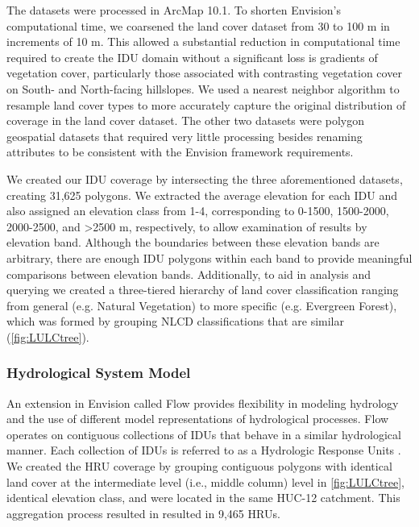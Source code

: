 \documentclass[11pt,letterpaper]{article}
\begin{document}
The datasets were processed in ArcMap 10.1. To shorten Envision's computational time, we coarsened the land cover dataset from 30 to 100 m in increments of 10 m. This allowed a substantial reduction in computational time required to create the IDU domain without a significant loss is gradients of vegetation cover, particularly those associated with contrasting vegetation cover on South- and North-facing hillslopes. We used a nearest neighbor algorithm to resample land cover types to more accurately capture the original distribution of coverage in the land cover dataset. The other two datasets were polygon geospatial datasets that required very little processing besides renaming attributes to be consistent with the Envision framework requirements.

We created our IDU coverage by intersecting the three aforementioned datasets, creating 31,625 polygons. We extracted the average elevation for each IDU and also assigned an elevation class from 1-4, corresponding to 0-1500, 1500-2000, 2000-2500, and >2500 m, respectively, to allow examination of results by elevation band. Although the boundaries between these elevation bands are arbitrary, there are enough IDU polygons within each band to provide meaningful comparisons between elevation bands. Additionally, to aid in analysis and querying we created a three-tiered hierarchy of land cover classification ranging from general (e.g. Natural Vegetation) to more specific (e.g. Evergreen Forest), which was formed by grouping NLCD classifications that are similar (\cref{fig:LULCtree}).

\subsubsection{Hydrological System Model}

An extension in Envision called Flow provides flexibility in modeling hydrology and the use of different model representations of hydrological processes. Flow operates on contiguous collections of IDUs that behave in a similar hydrological manner. Each collection of IDUs is referred to as a Hydrologic Response Units \citep[HRUs,][]{Jin:2011ii,Turner:2016ia}. We created the HRU coverage by grouping contiguous polygons with identical land cover at the intermediate level (i.e., middle column) level in \cref{fig:LULCtree}, identical elevation class, and were located in the same HUC-12 catchment. This aggregation process resulted in resulted in 9,465 HRUs.
\end{document}
